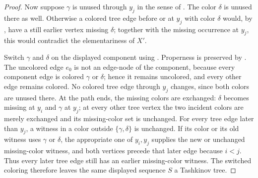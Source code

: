 \begin{proof}
Now suppose $\gamma$ is unused through $y_j$ in the sense of
.  The color $\delta$ is unused there as
well.  Otherwise a colored tree edge before or at $y_j$ with color
$\delta$ would, by , have a still earlier vertex
missing $\delta$; together with the missing occurrence at $y_j$, this would
contradict the elementariness of $X'$.

Switch $\gamma$ and $\delta$ on the displayed component using
.  Properness is preserved by
.  The uncolored edge $e_0$ is not an
edge-node of the component, because every component edge is colored
$\gamma$ or $\delta$; hence it remains uncolored, and every other edge
remains colored.  No colored tree edge
through $y_j$ changes, since both colors are unused there.  At the path
ends, the missing colors are exchanged: $\delta$ becomes missing at $y_i$
and $\gamma$ at $y_j$; at every other tree vertex the two incident colors
are merely exchanged and its missing-color set is unchanged.  For every
tree edge later than $y_j$, a witness in a color outside
$\{\gamma,\delta\}$ is unchanged.  If its color or its old witness uses
$\gamma$ or $\delta$, the appropriate one of $y_i,y_j$ supplies the new
or unchanged missing-color witness, and both vertices precede that later
edge because $i<j$.  Thus every later tree edge still has an earlier
missing-color witness.  The switched coloring therefore leaves the same
displayed sequence $S$ a Tashkinov tree.
\end{proof}
